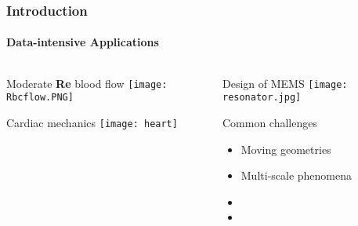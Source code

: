 \begin{frame}	
\frametitle{Introduction }
\framesubtitle{Data-intensive Applications}

\begin{columns}
\begin{column}{.5\textwidth}
 
            \begin{center} Moderate \textbf{Re} blood flow \texttt{[image: Rbcflow.PNG]} \end{center}

  	\begin{center} Cardiac mechanics \texttt{[image: heart]} \end{center}

\end{column}
\begin{column}{.5\textwidth}
    \begin{center}Design of MEMS \texttt{[image: resonator.jpg]} \end{center}
    
\begin{block}{Common challenges}
\begin{itemize}
 \item Moving geometries
 \item Multi-scale phenomena
 \item
 \item
\end{itemize}
\end{block}

\end{column}
\end{columns}
\end{frame}

